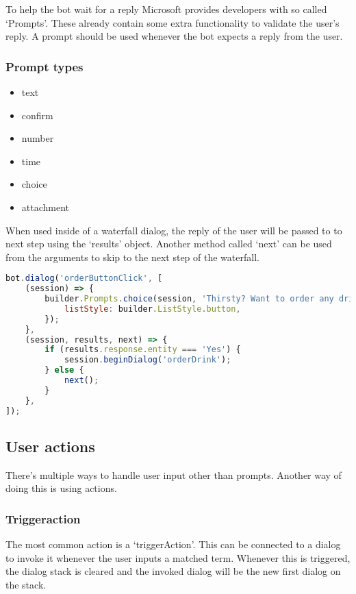 To help the bot wait for a reply Microsoft provides developers with so called `Prompts'. These already contain some extra functionality to validate the user's reply. A prompt should be used whenever the bot expects a reply from the user.

\subsubsection{Prompt types}

\begin{itemize}
	\item text
	\item confirm
	\item number
	\item time
	\item choice
	\item attachment
\end{itemize}

When used inside of a waterfall dialog, the reply of the user will be passed to to next step using the `results' object. Another method called `next' can be used from the arguments to skip to the next step of the waterfall.

\begin{lstlisting}[language=JavaScript,caption=2-step waterfall using a prompt,label=listing:botframework-mock-event]
bot.dialog('orderButtonClick', [
	(session) => {
		builder.Prompts.choice(session, 'Thirsty? Want to order any drinks?', 'Yes|No drinks', {
			listStyle: builder.ListStyle.button,
		});
	},
	(session, results, next) => {
		if (results.response.entity === 'Yes') {
			session.beginDialog('orderDrink');
		} else {
			next();
		}
	},
]);
\end{lstlisting}

\subsection{User actions}

There's multiple ways to handle user input other than prompts. Another way of doing this is using actions.

\subsubsection{Triggeraction}

The most common action is a `triggerAction'. This can be connected to a dialog to invoke it whenever the user inputs a matched term. Whenever this is triggered, the dialog stack is cleared and the invoked dialog will be the new first dialog on the stack.

